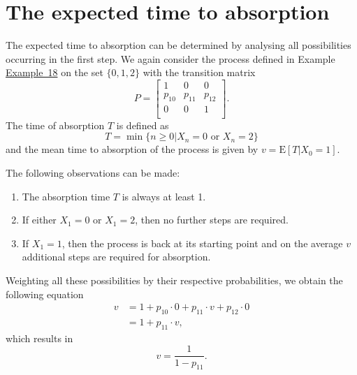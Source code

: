 \documentclass[
]{book}
\theoremstyle{definition}
\theoremstyle{definition}
\theoremstyle{definition}
\theoremstyle{definition}
\theoremstyle{remark}
\begin{document}
\hypertarget{the-expected-time-to-absorption}{%
\section{The expected time to absorption}\label{the-expected-time-to-absorption}}

The expected time to absorption can be determined by analysing all
possibilities occurring in the first step. We again consider the process
defined in Example \protect\hyperlink{eg_absorption}{Example~18} on the set \(\{0, 1, 2\}\) with the transition
matrix \[P = \begin{bmatrix}
    1 & 0 & 0    \\
    p_{10} & p_{11} & p_{12}   \\
   0 & 0 & 1   \\
\end{bmatrix}.\] The time of absorption \(T\) is defined as
\[T = \min\{ n \ge 0 | X_n = 0 \text{ or } X_n = 2 \}\] and the mean
time to absorption of the process is given by
\(v = \mathrm{E}[T | X_0 = 1 ] .\)

The following observations can be made:

\begin{enumerate}
\def\labelenumi{\arabic{enumi}.}
\item
  The absorption time \(T\) is always at least 1.
\item
  If either \(X_1 = 0\) or \(X_1 = 2\), then no further steps are
  required.
\item
  If \(X_1 = 1\), then the process is back at its starting point and on
  the average \(v\) additional steps are required for absorption.
\end{enumerate}

Weighting all these possibilities by their respective probabilities, we
obtain the following equation \[\begin{aligned}
v &= 1 + p_{10} \cdot 0 + p_{11} \cdot v  + p_{12} \cdot 0    \\
  &= 1 +  p_{11} \cdot v,\end{aligned}\] which results in
\[v = \frac{1}{1 - p_{11}}.\]
\end{document}
